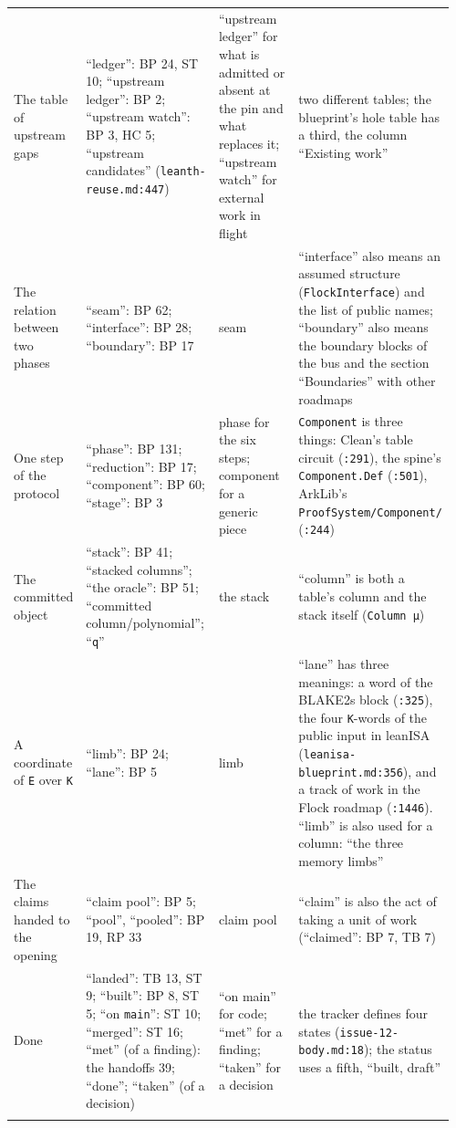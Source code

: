 {\begin{longtable}{@{}>{\raggedright\arraybackslash}p{0.143\linewidth}>{\raggedright\arraybackslash}p{0.316\linewidth}>{\raggedright\arraybackslash}p{0.210\linewidth}>{\raggedright\arraybackslash}p{0.287\linewidth}@{}}
The table of upstream gaps & ``ledger'': BP 24, ST 10; ``upstream ledger'': BP 2; ``upstream watch'': BP 3, HC 5; ``upstream candidates'' (\texttt{leanth-\allowbreak{}reuse.\allowbreak{}md:\allowbreak{}447}) & ``upstream ledger'' for what is admitted or absent at the pin and what replaces it; ``upstream watch'' for external work in flight & two different tables; the blueprint's hole table has a third, the column ``Existing work'' \\\addlinespace[2pt]
The relation between two phases & ``seam'': BP 62; ``interface'': BP 28; ``boundary'': BP 17 & seam & ``interface'' also means an assumed structure (\texttt{FlockInterface}) and the list of public names; ``boundary'' also means the boundary blocks of the bus and the section ``Boundaries'' with other roadmaps \\\addlinespace[2pt]
One step of the protocol & ``phase'': BP 131; ``reduction'': BP 17; ``component'': BP 60; ``stage'': BP 3 & phase for the six steps; component for a generic piece & \texttt{Component} is three things: Clean's table circuit (\texttt{:\allowbreak{}291}), the spine's \texttt{Component.\allowbreak{}Def} (\texttt{:\allowbreak{}501}), ArkLib's \texttt{Proof\allowbreak{}System/\allowbreak{}Component/\allowbreak{}} (\texttt{:\allowbreak{}244}) \\\addlinespace[2pt]
The committed object & ``stack'': BP 41; ``stacked columns''; ``the oracle'': BP 51; ``committed column/polynomial''; ``\texttt{q}'' & the stack & ``column'' is both a table's column and the stack itself (\texttt{Column μ}) \\\addlinespace[2pt]
A coordinate of \texttt{E} over \texttt{K} & ``limb'': BP 24; ``lane'': BP 5 & limb & ``lane'' has three meanings: a word of the BLAKE2s block (\texttt{:\allowbreak{}325}), the four \texttt{K}-words of the public input in leanISA (\texttt{leanisa-\allowbreak{}blueprint.\allowbreak{}md:\allowbreak{}356}), and a track of work in the Flock roadmap (\texttt{:\allowbreak{}1446}). ``limb'' is also used for a column: ``the three memory limbs'' \\\addlinespace[2pt]
The claims handed to the opening & ``claim pool'': BP 5; ``pool'', ``pooled'': BP 19, RP 33 & claim pool & ``claim'' is also the act of taking a unit of work (``claimed'': BP 7, TB 7) \\\addlinespace[2pt]
Done & ``landed'': TB 13, ST 9; ``built'': BP 8, ST 5; ``on \texttt{main}'': ST 10; ``merged'': ST 16; ``met'' (of a finding): the handoffs 39; ``done''; ``taken'' (of a decision) & ``on main'' for code; ``met'' for a finding; ``taken'' for a decision & the tracker defines four states (\texttt{issue-\allowbreak{}12-\allowbreak{}body.\allowbreak{}md:\allowbreak{}18}); the status uses a fifth, ``built, draft'' \\\addlinespace[2pt]

\end{longtable}}
